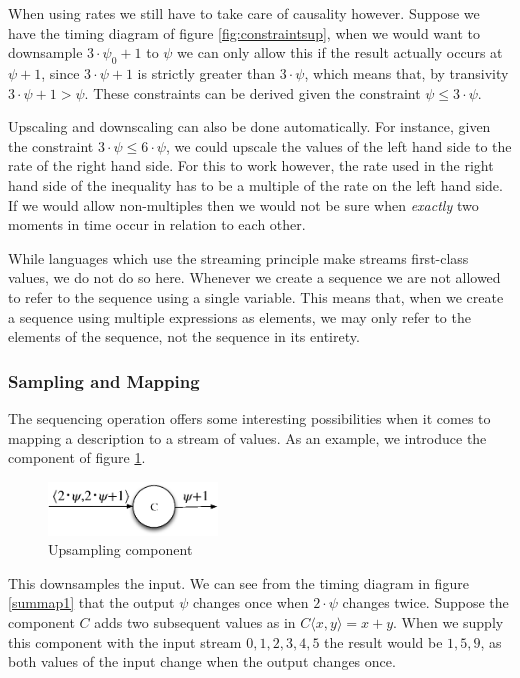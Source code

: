 When using rates we still have to take care of causality however.
Suppose we have the timing diagram of figure \ref{fig:constraintsup}, when we would want to downsample $3 \cdot \psi_0 + 1$ to $\psi$ we can only allow this if the result actually occurs at $\psi+1$, since $3 \cdot \psi + 1$ is strictly greater than $3 \cdot \psi$, which means that, by transivity $3 \cdot \psi + 1 > \psi$.
These constraints can be derived given the constraint $\psi \le 3 \cdot \psi$.

Upscaling and downscaling can also be done automatically. 
For instance, given the constraint $3 \cdot \psi \le 6 \cdot \psi$, we could upscale the values of the left hand side to the rate of the right hand side.
For this to work however, the rate used in the right hand side of the inequality has to be a multiple of the rate on the left hand side.
If we would allow non-multiples then we would not be sure when \textit{exactly} two moments in time occur in relation to each other.

While languages which use the streaming principle make streams first-class values, we do not do so here.
Whenever we create a sequence we are not allowed to refer to the sequence using a single variable.
This means that, when we create a sequence using multiple expressions as elements, we may only refer to the elements of the sequence, not the sequence in its entirety.

\subsubsection{Sampling and Mapping}
The sequencing operation offers some interesting possibilities when it comes to mapping a description to a stream of values.
As an example, we introduce the component of figure \ref{fig:summapc1}.

\begin{figure}[h]
\centering
\includegraphics[width=0.4\textwidth]{images/summapc1}
\caption{Upsampling component}
\label{fig:summapc1}
\end{figure}

This downsamples the input. 
We can see from the timing diagram in figure \ref{summap1} that the output $\psi$ changes once when $2 \cdot \psi$ changes twice.
Suppose the component $C$ adds two subsequent values as in $C \langle x, y \rangle = x + y$.
When we supply this component with the input stream $0,1,2,3,4,5$ the result would be $1,5,9$, as both values of the input change when the output changes once.


